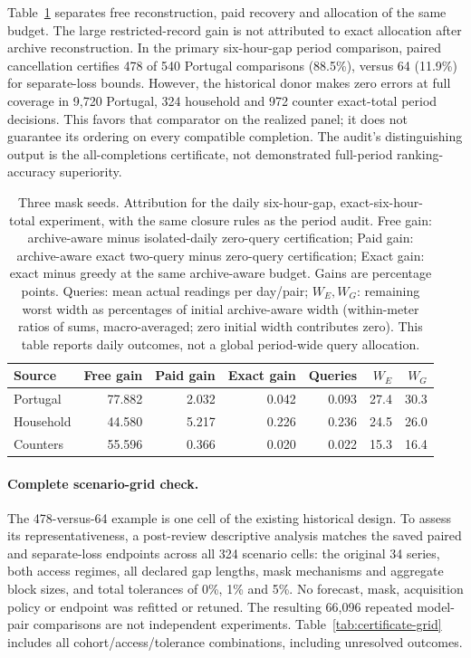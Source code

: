 \documentclass[12pt]{article}
\begin{document}
Table~\ref{tab:recovery-attribution} separates free reconstruction, paid
recovery and allocation of the same budget. The large restricted-record
gain is not attributed to exact allocation after archive reconstruction.
In the primary six-hour-gap period comparison, paired cancellation certifies
478 of 540 Portugal comparisons (88.5\%), versus 64 (11.9\%) for separate-loss
bounds. However, the historical donor makes zero errors at full coverage in
9,720 Portugal, 324 household and 972 counter exact-total period decisions.
This favors that comparator on the realized panel; it does not guarantee
its ordering on every compatible completion. The audit's distinguishing
output is the all-completions certificate, not demonstrated full-period
ranking-accuracy superiority.

\begin{table}[htbp]
\centering\normalsize\setlength{\tabcolsep}{4pt}
\caption{Three mask seeds. Attribution for the daily six-hour-gap, exact-six-hour-total experiment, with the same closure rules as the period audit. Free gain: archive-aware minus isolated-daily zero-query certification; Paid gain: archive-aware exact two-query minus zero-query certification; Exact gain: exact minus greedy at the same archive-aware budget. Gains are percentage points. Queries: mean actual readings per day/pair; $W_E,W_G$: remaining worst width as percentages of initial archive-aware width (within-meter ratios of sums, macro-averaged; zero initial width contributes zero). This table reports daily outcomes, not a global period-wide query allocation.}
\label{tab:recovery-attribution}
\begin{tabular}{lrrrrrr}
\toprule
Source & Free gain & Paid gain & Exact gain & Queries & $W_E$ & $W_G$\\
\midrule
Portugal & 77.882 & 2.032 & 0.042 & 0.093 & 27.4 & 30.3\\
Household & 44.580 & 5.217 & 0.226 & 0.236 & 24.5 & 26.0\\
Counters & 55.596 & 0.366 & 0.020 & 0.022 & 15.3 & 16.4\\
\bottomrule
\end{tabular}
\end{table}
\FloatBarrier
\paragraph{Complete scenario-grid check.}
The 478-versus-64 example is one cell of the existing historical design.
To assess its representativeness, a post-review descriptive analysis matches
the saved paired and separate-loss endpoints across all 324 scenario cells:
the original 34 series, both access regimes, all declared gap lengths,
mask mechanisms and aggregate block sizes, and total tolerances of
0\%, 1\% and 5\%. No forecast, mask, acquisition policy or endpoint was
refitted or retuned. The resulting 66,096 repeated model-pair comparisons
are not independent experiments. Table~\ref{tab:certificate-grid} includes
all cohort/access/tolerance combinations, including unresolved outcomes.
\end{document}
